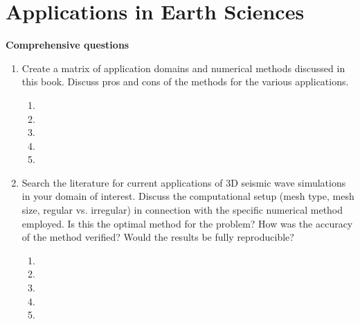 
\chapter{Applications in Earth Sciences}

{\bf Comprehensive questions}
\begin{enumerate}
\item 
Create a matrix of application domains and numerical methods discussed in this book. Discuss pros and cons of the methods for the various applications. 
\begin{enumerate}
\item[]
\item[]
\item[] 
\item[]
\item[] 
\end{enumerate}
\item 
Search the literature for current applications of 3D seismic wave simulations in your domain of interest. Discuss the computational setup (mesh type, mesh size, regular vs. irregular) in connection with the specific numerical method employed. Is this the optimal method for the problem? How was the accuracy of the method verified? Would the results be fully reproducible? 
\begin{enumerate}
\item[]
\item[]
\item[] 
\item[]
\item[] 
\end{enumerate}
\end{enumerate}